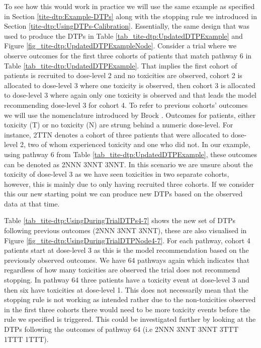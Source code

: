 To see how this would work in practice we will use the same example as specified in Section \ref{tite-dtp:Example-DTPs} along with the stopping rule we introduced in Section \ref{tite-dtp:UsingDTPs-Calibration}. Essentially, the same design that was used to produce the DTPs in Table \ref{tab_tite-dtp:UpdatedDTPExample} and Figure \ref{fig_tite-dtp:UpdatedDTPExampleNode}. Consider a trial where we observe outcomes for the first three cohorts of patients that match pathway 6 in Table \ref{tab_tite-dtp:UpdatedDTPExample}. That implies the first cohort of patients is recruited to dose-level 2 and no toxicities are observed, cohort 2 is allocated to dose-level 3 where one toxicity is observed, then cohort 3 is allocated to dose-level 3 where again only one toxicity is observed and that leads the model recommending dose-level 3 for cohort 4. To refer to previous cohorts' outcomes we will use the nomenclature introduced by Brock \cite{brockImplementingEffToxDosefinding2017}. Outcomes for patients, either toxicity (T) or no toxicity (N) are strung behind a numeric dose-level. For instance, 2TTN denotes a cohort of three patients that were allocated to dose-level 2, two of whom experienced toxicity and one who did not. In our example, using pathway 6 from Table \ref{tab_tite-dtp:UpdatedDTPExample}, these outcomes can be denoted as 2NNN 3NNT 3NNT. In this scenario we are unsure about the toxicity of dose-level 3 as we have seen toxicities in two separate cohorts, however, this is mainly due to only having recruited three cohorts. If we consider this our new starting point we can produce new DTPs based on the observed data at that time. 

Table \ref{tab_tite-dtp:UsingDuringTrialDTPs4-7} shows the new set of DTPs following previous outcomes (2NNN 3NNT 3NNT), these are also visualised in Figure \ref{fig_tite-dtp:UsingDuringTrialDTPNode4-7}. For each pathway, cohort 4 patients start at dose-level 3 as this is the model recommendation based on the previously observed outcomes. We have 64 pathways again which indicates that regardless of how many toxicities are observed the trial does not recommend stopping. In pathway 64 three patients have a toxicity event at dose-level 3 and then six have toxicities at dose-level 1. This does not necessarily mean that the stopping rule is not working as intended rather due to the non-toxicities observed in the first three cohorts there would need to be more toxicity events before the rule we specified is triggered. This could be investigated further by looking at the DTPs following the outcomes of pathway 64 (i.e 2NNN 3NNT 3NNT 3TTT 1TTT 1TTT). 

